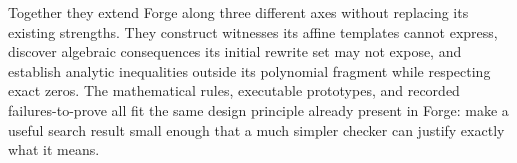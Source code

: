 Together they extend Forge along three different axes without replacing its existing strengths. They construct witnesses its affine templates cannot express, discover algebraic consequences its initial rewrite set may not expose, and establish analytic inequalities outside its polynomial fragment while respecting exact zeros. The mathematical rules, executable prototypes, and recorded failures-to-prove all fit the same design principle already present in Forge: make a useful search result small enough that a much simpler checker can justify exactly what it means.
